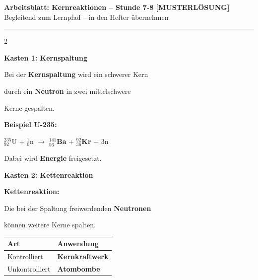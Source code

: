 \documentclass[10pt, a4paper]{article}
\newcommand{\fachfarbe}{physik}
\newcommand{\thema}{Kernreaktionen}
\newcommand{\stunde}{Stunde 7-8}
\newcommand{\lsg}[1]{\textcolor{loesung}{\textbf{#1}}}
\newcommand{\abschnitt}[1]{%
    \vspace{8pt}\noindent\textbf{\textcolor{\fachfarbe}{#1}}\vspace{4pt}
}
\begin{document}
\begin{center}
{\large\bfseries Arbeitsblatt: \thema{} -- \stunde{} \textcolor{loesung}{[MUSTERLÖSUNG]}}\\[2pt]
{\small\textcolor{grau}{Begleitend zum Lernpfad -- in den Hefter übernehmen}}
\end{center}
\vspace{-2pt}\hrule\vspace{8pt}

\begin{multicols}{2}
\small


\abschnitt{Kasten 1: Kernspaltung}

\begin{merksatz}
Bei der \textbf{Kernspaltung} wird ein schwerer Kern

durch ein \lsg{Neutron} in zwei mittelschwere

Kerne gespalten.

\vspace{6pt}

\textbf{Beispiel U-235:}

$^{235}_{92}$U + $^{1}_{0}$n $\rightarrow$ \lsg{$^{141}_{56}$Ba} + \lsg{$^{92}_{36}$Kr} + 3n

\vspace{6pt}

Dabei wird \lsg{Energie} freigesetzt.
\end{merksatz}

\vspace{6pt}


\abschnitt{Kasten 2: Kettenreaktion}

\begin{merksatz}
\textbf{Kettenreaktion:}

Die bei der Spaltung freiwerdenden \lsg{Neutronen}

können weitere Kerne spalten.

\vspace{6pt}

\renewcommand{\arraystretch}{1.4}
\begin{tabular}{|p{2.5cm}|p{3.5cm}|}
\hline
\textbf{Art} & \textbf{Anwendung} \\
\hline
Kontrolliert & \lsg{Kernkraftwerk} \\
\hline
Unkontrolliert & \lsg{Atombombe} \\
\hline
\end{tabular}
\renewcommand{\arraystretch}{1}


\end{merksatz}
\end{multicols}
\end{document}
